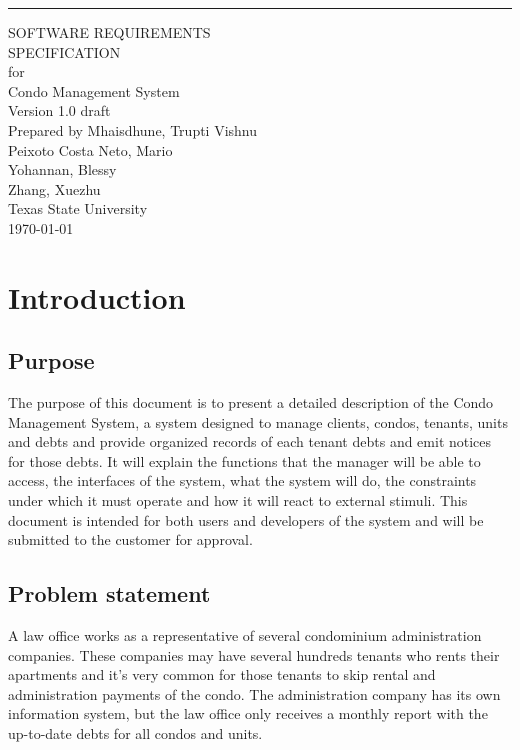 \documentclass{scrreprt}
\date{}
\def\myversion{1.0 }
\begin{document}
\begin{flushright}
    \rule{16cm}{5pt}\vskip1cm
    \begin{bfseries}
        \Huge{SOFTWARE REQUIREMENTS\\ SPECIFICATION}\\
        \vspace{1.5cm}
        for\\
        \vspace{1.5cm}
        Condo Management System\\
        \vspace{1.5cm}
        \LARGE{Version \myversion draft}\\
        \vspace{1.5cm}
        Prepared by Mhaisdhune, Trupti Vishnu\\
        Peixoto Costa Neto, Mario\\
        Yohannan, Blessy\\
        Zhang, Xuezhu\\
        \vspace{1.5cm}
        Texas State University\\
        \vspace{1.5cm}
        \today\\
    \end{bfseries}
\end{flushright}

\tableofcontents

\chapter{Introduction}

\section{Purpose}
The purpose of this document is to present a detailed description of the Condo Management System, a system designed to manage clients, condos, tenants, units and debts and provide organized records of each tenant debts and emit notices for those debts. It will explain the functions that the manager will be able to access, the interfaces of the system, what the system will do, the constraints under which it must operate and how it will react to external stimuli. This document is intended for both users and developers of the system and will be submitted to the customer for approval.

\section{Problem statement}
A law office works as a representative of several condominium administration companies. These companies may have several hundreds tenants who rents their apartments and it’s very common for those tenants to skip rental and administration payments of the condo. The administration company has its own information system, but the law office only receives a monthly report with the up-to-date debts for all condos and units.
\end{document}
